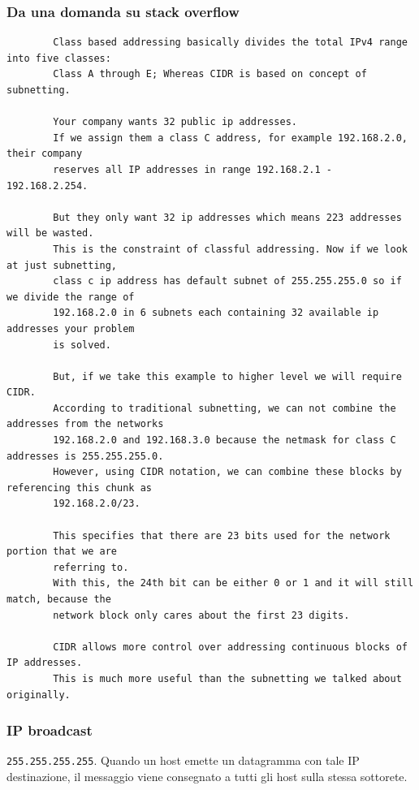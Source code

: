 \subsubsection{Da una domanda su stack overflow}

\begin{small}
	\begin{verbatim}
		Class based addressing basically divides the total IPv4 range into five classes: 
		Class A through E; Whereas CIDR is based on concept of subnetting.
		
		Your company wants 32 public ip addresses.
		If we assign them a class C address, for example 192.168.2.0, their company 
		reserves all IP addresses in range 192.168.2.1 - 192.168.2.254. 
		
		But they only want 32 ip addresses which means 223 addresses will be wasted.
		This is the constraint of classful addressing. Now if we look at just subnetting, 
		class c ip address has default subnet of 255.255.255.0 so if we divide the range of 
		192.168.2.0 in 6 subnets each containing 32 available ip addresses your problem 
		is solved. 
		
		But, if we take this example to higher level we will require CIDR.
		According to traditional subnetting, we can not combine the addresses from the networks 
		192.168.2.0 and 192.168.3.0 because the netmask for class C addresses is 255.255.255.0. 
		However, using CIDR notation, we can combine these blocks by referencing this chunk as 
		192.168.2.0/23.
		
		This specifies that there are 23 bits used for the network portion that we are 
		referring to. 
		With this, the 24th bit can be either 0 or 1 and it will still match, because the 
		network block only cares about the first 23 digits.
		
		CIDR allows more control over addressing continuous blocks of IP addresses. 
		This is much more useful than the subnetting we talked about originally.
	\end{verbatim}
\end{small}
\subsubsection{IP broadcast}
\verb|255.255.255.255|. Quando un host emette un datagramma con tale IP destinazione, il messaggio viene consegnato a tutti gli host sulla stessa sottorete.



\newpage

